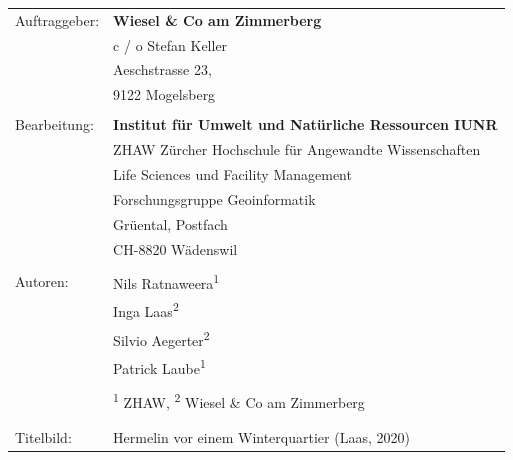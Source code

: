 \documentclass[
  oneside]{scrbook}
\begin{document}
\begin{titlepage}
\begin{flushleft}
\begin{minipage}{21cm}
\begin{tabular}{ll}
Auftraggeber: & \textbf{Wiesel \& Co am Zimmerberg}                         \\
              & c / o Stefan Keller                                         \\
              & Aeschstrasse 23,                                            \\
              & 9122 Mogelsberg                                             \\
              &                                                             \\
Bearbeitung:  & \textbf{Institut für Umwelt und Natürliche Ressourcen IUNR} \\
              & ZHAW Zürcher Hochschule für Angewandte Wissenschaften       \\
              & Life Sciences und Facility Management                       \\
              & Forschungsgruppe Geoinformatik                              \\
              & Grüental, Postfach                                          \\
              & CH-8820 Wädenswil                                           \\
              &                                                             \\
Autoren:      & Nils Ratnaweera\textsuperscript{1}                         \\
              & Inga Laas\textsuperscript{2}                              \\
              & Silvio Aegerter\textsuperscript{2}                        \\
              & Patrick Laube\textsuperscript{1}                           \\
              &                                                             \\
              & \textsuperscript{1} ZHAW, \textsuperscript{2} Wiesel \& Co am Zimmerberg \\
              &                                                             \\
              &                                                             \\
Titelbild:    & Hermelin vor einem Winterquartier (Laas, 2020)                
\end{tabular}
\end{minipage}


\end{flushleft}

\end{titlepage}
\makeatother
\end{document}
